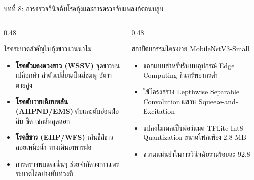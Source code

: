 \documentclass[aspectratio=169, 10pt]{beamer}
\begin{document}
\begin{frame}{บทที่ 8: การตรวจวินิจฉัยโรคกุ้งและการตรวจจับแพลงก์ตอนบลูม}
\begin{columns}[T]
    \begin{column}{0.48\textwidth}
        \begin{mastercard}{โรคระบาดสำคัญในกุ้งขาวแวนนาไม}
            \begin{itemize}
                \item \textbf{โรคตัวแดงดวงขาว (WSSV)} จุดขาวบนเปลือกหัว ลำตัวเปลี่ยนเป็นสีชมพู อัตราตายสูง
                \item \textbf{โรคตับวายเฉียบพลัน (AHPND/EMS)} ตับและตับอ่อนฝ่อลีบ ซีด เซลล์หลุดลอก
                \item \textbf{โรคขี้ขาว (EHP/WFS)} เส้นขี้สีขาวลอยเหนือน้ำ ทางเดินอาหารฝ่อ
                \item การตรวจพบแต่เนิ่นๆ ช่วยจำกัดวงการแพร่ระบาดได้อย่างทันท่วงที
            \end{itemize}
        \end{mastercard}
    \end{column}
    \begin{column}{0.48\textwidth}
        \begin{aquacard}{สถาปัตยกรรมโครงข่าย MobileNetV3-Small}
            \begin{itemize}
                \item ออกแบบสำหรับรันบนอุปกรณ์ Edge Computing กินทรัพยากรต่ำ
                \item ใช้โครงสร้าง Depthwise Separable Convolution ผสาน Squeeze-and-Excitation
                \item แปลงโมเดลเป็นฟอร์แมต TFLite Int8 Quantization ขนาดไฟล์เพียง $2.8\text{ MB}$
                \item ความแม่นยำในการวินิจฉัยรวมร้อยละ 92.8
            \end{itemize}
        \end{aquacard}
    \end{column}
\end{columns}
\end{frame}
\end{document}
